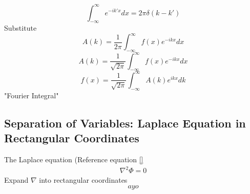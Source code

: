 \documentclass[12pt]{article}
\begin{document}
    \begin{equation} \label{eq: 11-11-28}
        \int_{-\infty}^{\infty} e^{-ik'x} dx= 2 \pi \delta(k-k')
    \end{equation}    
    Substitute
    \begin{equation} \label{eq: 11-11-29}
        A(k) = \frac{1}{2 \pi} \int_{-\infty}^{\infty} f(x) e^{-ikx} dx
    \end{equation}        
    \begin{equation} \label{eq: 11-11-30}
        A(k) = \frac{1}{\sqrt{2 \pi}} \int_{-\infty}^{\infty} f(x) e^{-ikx} dx
    \end{equation}        
    \begin{equation} \label{eq: 11-11-30}
        f(x) = \frac{1}{\sqrt{2 \pi}} \int_{-\infty}^{\infty} A(k) e^{ikx} dk
    \end{equation}        
    "Fourier Integral"

\subsection{Separation of Variables: Laplace Equation in Rectangular Coordinates} \label{sectionRecLap}
    The Laplace equation (Reference equation \ref{}
    \begin{gather*}
        \nabla^2 \Phi = 0
    \end{gather*}
    Expand $\nabla$ into rectangular coordinates
    \begin{equation} \label{eq: 12-12-1}
        ayo
    \end{equation}
\end{document}
